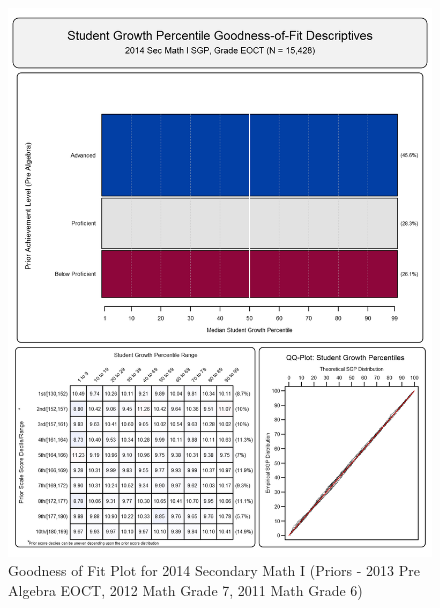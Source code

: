 \documentclass[12pt]{article}
\begin{document}
\begin{figure}[htbp]
\centering
\includegraphics{../img/Goodness_of_Fit/SEC_MATH_I.2014/2014_SEC_MATH_I_EOCT;2013_PRE_ALGEBRA_EOCT;2012_MATH_7;2011_MATH_6.png}
\caption{Goodness of Fit Plot for 2014 Secondary Math I (Priors - 2013
Pre Algebra EOCT, 2012 Math Grade 7, 2011 Math Grade 6)}
\end{figure}
\end{document}
